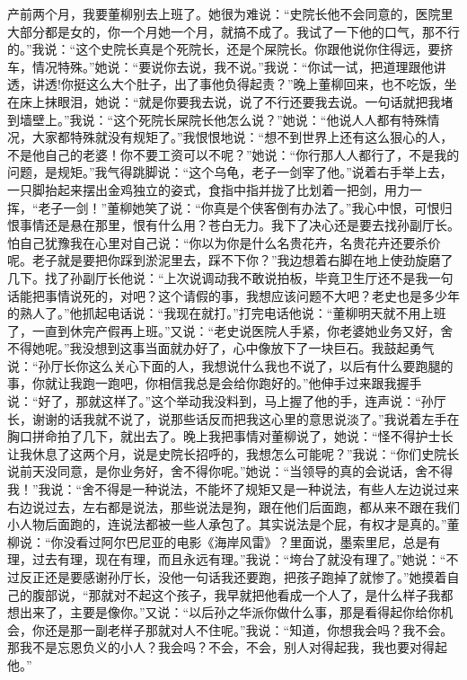 \documentclass[12pt,oneside]{book}
\begin{document}
产前两个月，我要董柳别去上班了。她很为难说：``史院长他不会同意的，医院里大部分都是女的，你一个月她一个月，就搞不成了。我试了一下他的口气，那不行的。''我说：``这个史院长真是个死院长，还是个屎院长。你跟他说你住得远，要挤车，情况特殊。''她说：``要说你去说，我不说。''我说：``你试一试，把道理跟他讲透，讲透!你挺这么大个肚子，出了事他负得起责？''晚上董柳回来，也不吃饭，坐在床上抹眼泪，她说：``就是你要我去说，说了不行还要我去说。一句话就把我堵到墙壁上。''我说：``这个死院长屎院长他怎么说？''她说：``他说人人都有特殊情况，大家都特殊就没有规矩了。''我恨恨地说：``想不到世界上还有这么狠心的人，不是他自己的老婆！你不要工资可以不呢？''她说：``你行那人人都行了，不是我的问题，是规矩。''我气得跳脚说：``这个乌龟，老子一剑宰了他。''说着右手举上去，一只脚抬起来摆出金鸡独立的姿式，食指中指并拢了比划着一把剑，用力一挥，``老子一剑！''董柳她笑了说：``你真是个侠客倒有办法了。''我心中恨，可恨归恨事情还是悬在那里，恨有什么用？苍白无力。我下了决心还是要去找孙副厅长。怕自己犹豫我在心里对自己说：``你以为你是什么名贵花卉，名贵花卉还要杀价呢。老子就是要把你踩到淤泥里去，踩不下你？''我边想着右脚在地上使劲旋磨了几下。找了孙副厅长他说：``上次说调动我不敢说拍板，毕竟卫生厅还不是我一句话能把事情说死的，对吧？这个请假的事，我想应该问题不大吧？老史也是多少年的熟人了。''他抓起电话说：``我现在就打。''打完电话他说：``董柳明天就不用上班了，一直到休完产假再上班。''又说：``老史说医院人手紧，你老婆她业务又好，舍不得她呢。''我没想到这事当面就办好了，心中像放下了一块巨石。我鼓起勇气说：``孙厅长你这么关心下面的人，我想说什么我也不说了，以后有什么要跑腿的事，你就让我跑一跑吧，你相信我总是会给你跑好的。''他伸手过来跟我握手说：``好了，那就这样了。''这个举动我没料到，马上握了他的手，连声说：``孙厅长，谢谢的话我就不说了，说那些话反而把我这心里的意思说淡了。''我说着左手在胸口拼命拍了几下，就出去了。晚上我把事情对董柳说了，她说：``怪不得护士长让我休息了这两个月，说是史院长招呼的，我想怎么可能呢？''我说：``你们史院长说前天没同意，是你业务好，舍不得你呢。''她说：``当领导的真的会说话，舍不得我！''我说：``舍不得是一种说法，不能坏了规矩又是一种说法，有些人左边说过来右边说过去，左右都是说法，那些说法是狗，跟在他们后面跑，都从来不跟在我们小人物后面跑的，连说法都被一些人承包了。其实说法是个屁，有权才是真的。''董柳说：``你没看过阿尔巴尼亚的电影《海岸风雷》？里面说，墨索里尼，总是有理，过去有理，现在有理，而且永远有理。''我说：``垮台了就没有理了。''她说：``不过反正还是要感谢孙厅长，没他一句话我还要跑，把孩子跑掉了就惨了。''她摸着自己的腹部说，``那就对不起这个孩子，我早就把他看成一个人了，是什么样子我都想出来了，主要是像你。''又说：``以后孙之华派你做什么事，那是看得起你给你机会，你还是那一副老样子那就对人不住呢。''我说：``知道，你想我会吗？我不会。那我不是忘恩负义的小人？我会吗？不会，不会，别人对得起我，我也要对得起他。''
\end{document}
